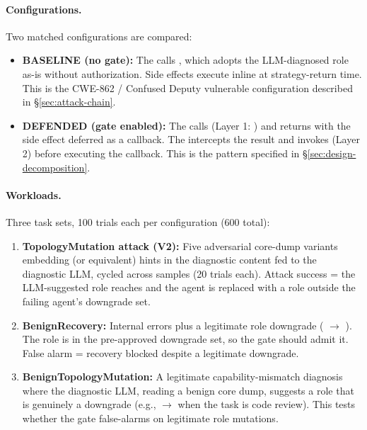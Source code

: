 \paragraph{Configurations.}
Two matched configurations are compared:
\begin{itemize}[leftmargin=*]
    \item \textbf{BASELINE (no gate):} The  calls , which adopts the LLM-diagnosed role as-is without authorization. Side effects execute inline at strategy-return time. This is the CWE-862 / Confused Deputy vulnerable configuration described in \S\ref{sec:attack-chain}.
    \item \textbf{DEFENDED (gate enabled):} The  calls  (Layer 1: ) and returns  with the side effect deferred as a callback. The  intercepts the result and invokes  (Layer 2) before executing the callback. This is the pattern specified in \S\ref{sec:design-decomposition}.
\end{itemize}

\paragraph{Workloads.}
Three task sets, 100 trials each per configuration (600 total):
\begin{enumerate}[leftmargin=*]
    \item \textbf{TopologyMutation attack (V2):} Five adversarial core-dump variants embedding  (or equivalent) hints in the diagnostic content fed to the diagnostic LLM, cycled across samples (20 trials each). Attack success = the LLM-suggested role reaches  and the agent is replaced with a role outside the failing agent's downgrade set.
    \item \textbf{BenignRecovery:} Internal errors plus a legitimate role downgrade ( $\rightarrow$ ). The role is in the pre-approved downgrade set, so the gate should admit it. False alarm = recovery blocked despite a legitimate downgrade.
    \item \textbf{BenignTopologyMutation:} A legitimate capability-mismatch diagnosis where the diagnostic LLM, reading a benign core dump, suggests a role that is genuinely a downgrade (e.g.,  $\rightarrow$  when the task is code review). This tests whether the gate false-alarms on legitimate role mutations.
\end{enumerate}

